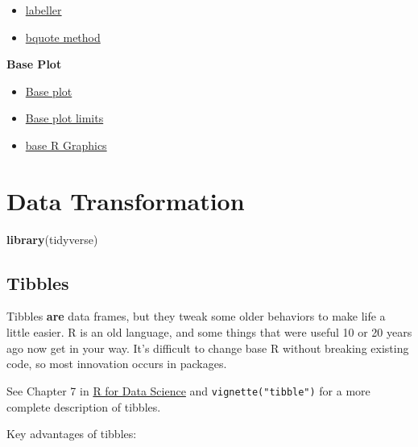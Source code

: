 \documentclass[]{book}
\newenvironment{Shaded}{\begin{snugshade}}{\end{snugshade}}
\newcommand{\KeywordTok}[1]{\textcolor[rgb]{0.13,0.29,0.53}{\textbf{#1}}}
\newcommand{\NormalTok}[1]{#1}
\providecommand{\tightlist}{%
  \setlength{\itemsep}{0pt}\setlength{\parskip}{0pt}}
\theoremstyle{definition}
\theoremstyle{definition}
\theoremstyle{definition}
\theoremstyle{remark}
\let\BeginKnitrBlock\begin \let\EndKnitrBlock\end
\begin{document}
\begin{itemize}
\tightlist
\item
  \href{http://ggplot2.tidyverse.org/reference/label_bquote.html}{labeller}
\item
  \href{https://trinkerrstuff.wordpress.com/2018/03/15/2246/}{bquote
  method}
\end{itemize}

\textbf{Base Plot}

\begin{itemize}
\tightlist
\item
  \href{https://www.stat.auckland.ac.nz/~ihaka/120/Notes/ch03.pdf}{Base
  plot}
\item
  \href{https://www.stat.auckland.ac.nz/~ihaka/787/lectures-r-graphics.pdf}{Base
  plot limits}
\item
  \href{https://blog.jumpingrivers.com/posts/2018/2018-01-24-base-r-graphics/}{base
  R Graphics}
\end{itemize}

\chapter{Data Transformation}\label{data-transformation}

\begin{Shaded}
\begin{Highlighting}[]
\KeywordTok{library}\NormalTok{(tidyverse)}
\end{Highlighting}
\end{Shaded}

\section{Tibbles}\label{tibbles}

Tibbles \textbf{are} data frames, but they tweak some older behaviors to
make life a little easier. R is an old language, and some things that
were useful 10 or 20 years ago now get in your way. It's difficult to
change base R without breaking existing code, so most innovation occurs
in packages.

\BeginKnitrBlock{rmdimportant}
See Chapter 7 in \href{http://r4ds.had.co.nz/tibbles.html}{R for Data
Science} and \texttt{vignette("tibble")} for a more complete description
of tibbles.
\EndKnitrBlock{rmdimportant}

Key advantages of tibbles:
\end{document}
